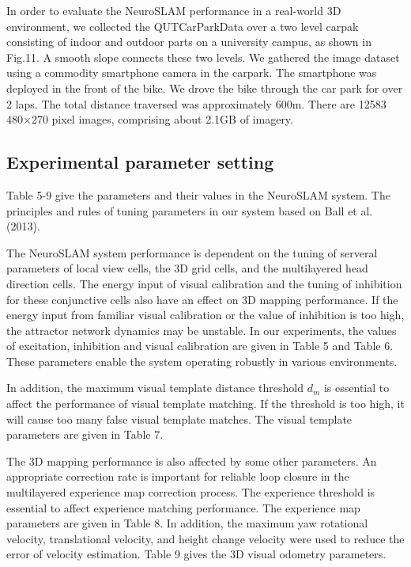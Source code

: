 In order to evaluate the NeuroSLAM performance in a real-world 3D environment, we collected the QUTCarParkData over a two level carpak consisting of indoor and outdoor parts on a university campus, as shown in Fig.11.
A smooth slope connects these two levels.
We gathered the image dataset using a commodity smartphone camera in the carpark.
The smartphone was deployed in the front of the bike.
We drove the bike through the car park for over 2 laps. 
The total distance traversed was approximately 600m.
There are 12583 480$ \times $270 pixel images, comprising about 2.1GB of imagery.


\subsection{Experimental parameter setting}
Table 5-9 give the parameters and their values in the NeuroSLAM system.
The principles and rules of tuning parameters in our system based on Ball et al.(2013).


The NeuroSLAM system performance is dependent on the tuning of serveral parameters of local view cells, the 3D grid cells, and the multilayered head direction cells.
The energy input of visual calibration and the tuning of inhibition for these conjunctive cells also have an effect on 3D mapping performance.
If the energy input from familiar visual calibration or the value of inhibition is too high, the attractor network dynamics may be unstable.
In our experiments, the values of excitation, inhibition and visual calibration are given in Table 5 and Table 6.
These parameters enable the system operating robustly in various environments.


In addition, the maximum visual template distance threshold $ d_m $ is essential to affect the performance of visual template matching.
If the threshold is too high, it will cause too many false visual template matches.
The visual template parameters are given in Table 7.


The 3D mapping performance is also affected by some other parameters.
An appropriate correction rate is important for reliable loop closure in the multilayered experience map correction process.
The experience threshold is essential to affect experience matching performance.
The experience map parameters are given in Table 8.
In addition, the maximum yaw rotational velocity, translational velocity, and height change velocity were used to reduce the error of velocity estimation.
Table 9 gives the 3D visual odometry parameters.


